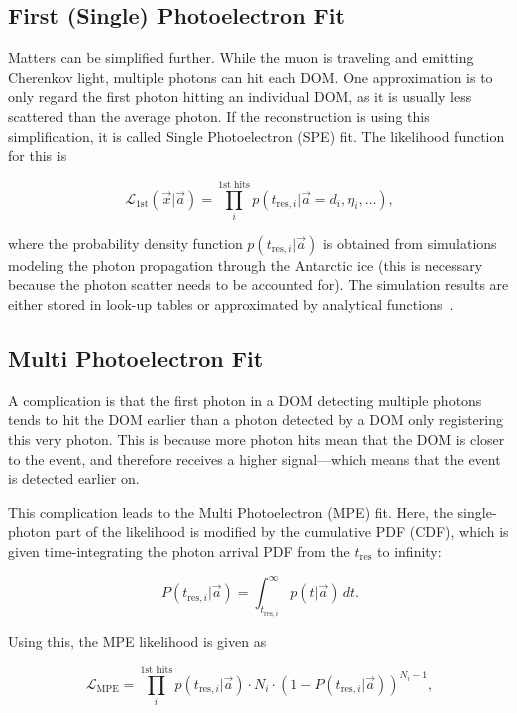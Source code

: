 \subsection{First (Single) Photoelectron Fit}
Matters can be simplified further. While the muon is traveling and emitting Cherenkov light, multiple photons can hit each DOM\@. One approximation is to only regard the first photon hitting an individual DOM, as it is usually less scattered than the average photon. If the reconstruction is using this simplification, it is called Single Photoelectron (SPE) fit. The likelihood function for this is

\begin{equation}
    \mathcal{L}_\text{1st}(\vec{x}|\vec{a}) = \prod_i^\text{1st hits} p(t_{\text{res},i}|\vec{a}=d_i, \eta_i,\ldots),
\end{equation}

where the probability density function $p(t_{\text{res},i}|\vec{a})$ is obtained from simulations modeling the photon propagation through the Antarctic ice (this is necessary because the photon scatter needs to be accounted for). The simulation results are either stored in look-up tables or approximated by analytical functions~\cite{Ahrens2004}.

\subsection{Multi Photoelectron Fit}
A complication is that the first photon in a DOM detecting multiple photons tends to hit the DOM earlier than a photon detected by a DOM only registering this very photon. This is because more photon hits mean that the DOM is closer to the event, and therefore receives a higher signal---which means that the event is detected earlier on.

This complication leads to the Multi Photoelectron (MPE) fit. Here, the single-photon part of the likelihood is modified by the cumulative PDF (CDF), which is given time-integrating the photon arrival PDF from the $t_\text{res}$ to infinity:

\begin{equation}
    P(t_{\text{res},i}|\vec{a}) = \int^{\infty}_{t_{\text{res},i}}p(t|\vec{a})\,dt.
\end{equation}

Using this, the MPE likelihood is given as

\begin{equation}
    \mathcal{L}_\text{MPE} = \prod_i^\text{1st hits} p(t_{\text{res},i}|\vec{a}) \cdot N_i \cdot (1-P(t_{\text{res},i}|\vec{a}))^{N_i-1},
\end{equation}

